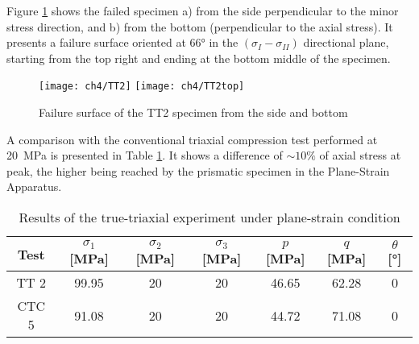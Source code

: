 Figure \ref{fig4:14} shows the failed specimen a) from the side perpendicular to the minor stress direction, and b) from the bottom (perpendicular to the axial stress). It presents a failure surface oriented at \ang{66} in the $(\sigma_I-\sigma_{II})$ directional plane, starting from the top right and ending at the bottom middle of the specimen. 


\begin{figure}[tb]
    \centering
    \texttt{[image: ch4/TT2]}
    \texttt{[image: ch4/TT2top]}
    \caption{Failure surface of the TT2 specimen from the side and bottom}
    \label{fig4:14}
\end{figure} 





A comparison with the conventional triaxial compression test performed at \SI{20}{MPa} is presented in Table \ref{tb4:TT2_CTC5}. It shows a difference of $\sim 10\%$ of axial stress at peak, the higher being reached by the prismatic specimen in the Plane-Strain Apparatus.

\begin{table}
    \centering
    \begin{tabular}{ccccccc}
        \hline
        Test & $\sigma_1$ [\si{MPa}] & $\sigma_2$ [\si{MPa}] & $\sigma_3$ [\si{MPa}] & $p$ [\si{MPa}] & $q$ [\si{MPa}] & $\theta$ [\si{\degree}] \\
        \hline
        \hline
        TT 2 & 99.95 & 20 & 20 & 46.65 & 62.28 & 0\\
        CTC 5 & 91.08 & 20 & 20 & 44.72 & 71.08 & 0 \\
        \hline
    \end{tabular}
    \caption{Results of the true-triaxial experiment under plane-strain condition}
    \label{tb4:TT2_CTC5}
\end{table}

